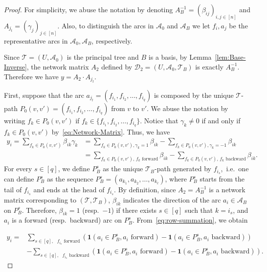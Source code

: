 \documentclass[11pt]{article}
\begin{document}
\begin{proof}
    For simplicity, we abuse the notation by denoting $A_B^{-1}=(\beta_{ij})_{i,j\in[n]}$ and $A_{j_t}=(\gamma_j)_{j\in[n]}$. Also, to distinguish the arcs in $\mathcal{A}_0$ and $\mathcal{A}_B$ we let $f_i,a_j$ be the representative arcs in $\mathcal{A}_0,\mathcal{A}_B$, respectively. 

    Since $\mathcal{T}=(U,\mathcal{A}_0)$ is the principal tree and $B$ is a basis, by Lemma~\ref{lem:Base-Inverse}, the network matrix $A_2$ defined by $\mathcal{D}_2=(U,\mathcal{A}_0,\mathcal{T}_B)$ is exactly $A_B^{-1}$. Therefore we have $y=A_2\cdot A_{j_t}$.

     First, suppose that the arc $a_{j_t}=(f_{i_1},f_{i_2},\dots,f_{i_q})$ is composed by the unique $\mathcal{T}$-path $P_0(v,v')=(f_{i_1},f_{i_2},\dots,f_{i_q})$ from $v$ to $v'$. We abuse the notation by writing $f_k\in P_0(v,v')$ if $f_k\in\{f_{i_1},f_{i_2},\dots,f_{i_q}\}$. Notice that $\gamma_k\neq 0$ if and only if $f_k\in P_0(v,v')$ by~\eqref{eq:Network-Matrix}. Thus, we have \begin{align}\label{eq:row-summation}
        y_i=\sum_{f_k\in P_0(v,v')}\beta_{ik}\gamma_k&=\sum_{f_k\in P_0(v,v'),\gamma_k=1}\beta_{ik}-\sum_{f_k\in P_0(v,v'),\gamma_k=-1}\beta_{ik}\nonumber\\
        &=\sum_{f_k\in P_0(v,v')\textrm{, $f_k$ forward}}\beta_{ik}-\sum_{f_k\in P_0(v,v')\textrm{, $f_k$ backward}}\beta_{ik}.
    \end{align}
    For every $s\in[q]$, we define $P_B^s$ as the unique $\mathcal{T}_B$-path generated by $f_{i_s}$,~i.e.~one can define $P_B^s$ as the sequence $P_B^s=(a_{k_1},a_{k_2},\dots,a_{k_\ell})$, where $P_B^s$ starts from the tail of $f_{i_s}$ and ends at the head of $f_{i_s}$. By definition, since $A_2=A_B^{-1}$ is a network matrix corresponding to $(\mathcal{T},\mathcal{T}_B)$, $\beta_{ik}$ indicates the direction of the arc $a_i\in\mathcal{A}_B$ on $P_B^s$. Therefore, $\beta_{ik}=1$ (resp.~$-1$) if there exists $s\in[q]$ such that $k=i_s$, and $a_i$ is a forward (resp.~backward) arc on $P_B^s$. From~\eqref{eq:row-summation}, we obtain

    \begin{align}\label{eq:row-summation-decompose}
        y_i=&\sum_{s\in[q],\textrm{ $f_{i_s}$ forward}}\left(\mathbf{1}(a_i\in P_B^s,\textrm{$a_i$ forward})-\mathbf{1}(a_i\in P_B^s,\textrm{$a_i$ backward})\right)\nonumber\\
        &-\sum_{s\in[q],\textrm{ $f_{i_s}$ backward}}\left(\mathbf{1}(a_i\in P_B^s,\textrm{$a_i$ forward})-\mathbf{1}(a_i\in P_B^s,\textrm{$a_i$ backward})\right). 
    \end{align}
    

\end{proof}
\end{document}
